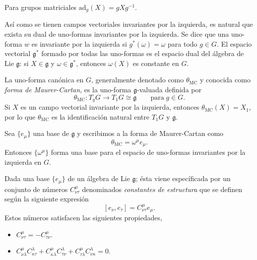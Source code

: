 Para grupos matriciales $\mathrm{ad}_{g} (X) = g X g^{-1}$.

\begin{mydef}
As\'{i} como se tienen campos vectoriales invariantes por la izquierda, es natural que exista su dual de uno-formas invariantes por la izquierda. Se dice que una uno-forma $w$ es invariante por la izquierda si $g^{*} (\omega) = \omega$ para todo $g \in G$. El espacio vectorial $\mathfrak{g}^{*}$ formado por todas las uno-formas es el espacio dual del \'{a}lgebra de Lie $\mathfrak{g}$: si $X \in \mathfrak{g}$ y $\omega \in \mathfrak{g}^{*}$, entonces $\omega (X)$ es constante en $G$.
\end{mydef}

\begin{mydef}
La uno-forma can\'{o}nica en $G$, generalmente denotado como $\theta_{\mathrm{MC}}$ y conocida como \emph{forma de Maurer-Cartan}, es la uno-forma $\mathfrak{g}$-valuada definida por
%
\begin{equation*}
\theta_{\mathrm{MC}}: T_{g} G \longrightarrow T_{1} G \cong \mathfrak{g} \qquad \mathrm{para} \; g \in G.
\end{equation*}
%
Si $X$ es un campo vectorial invariante por la izquierda, entonces $\theta_{\mathrm{MC}} (X) = X_{1}$, por lo que $\theta_{\mathrm{MC}}$ es la identificaci\'{o}n natural entre $T_{1} G$ y $\mathfrak{g}$. 
\end{mydef}

Sea $\{e_{\mu}\}$ una base de $\mathfrak{g}$ y escribimos a la forma de Maurer-Cartan como $$\theta_{\mathrm{MC}} = \omega^{\mu} e_{\mu}.$$ Entonces $\{ \omega^{\mu} \}$ forma una base para el espacio de uno-formas invariantes por la izquierda en $G$.

\begin{mydef}
Dada una base $\{e_{\mu}\}$ de un \'{a}lgebra de Lie $\mathfrak{g}$; \'{e}sta viene espec\'{i}ficada por un conjunto de n\'{u}meros $C^{\mu}_{\nu \tau}$ denominados \emph{constantes de estructura} que se definen seg\'{u}n la siguiente expresi\'{o}n $$[e_{\nu}, e_{\tau}] = C^{\mu}_{\nu \tau} e_{\mu}.$$ Estos n\'{u}meros satisfacen las siguientes propiedades,
%
\begin{itemize}
\item{$C^{\mu}_{\nu \tau} = -C^{\mu}_{\tau \nu}$.}
\item{$C^{\mu}_{\nu \lambda} C^{\lambda}_{\kappa \tau} + C^{\mu}_{\kappa \lambda} C^{\lambda}_{\tau \nu} + C^{\mu}_{\tau \lambda} C^{\lambda}_{\nu \kappa} = 0$.}
\end{itemize}
%
\end{mydef}

